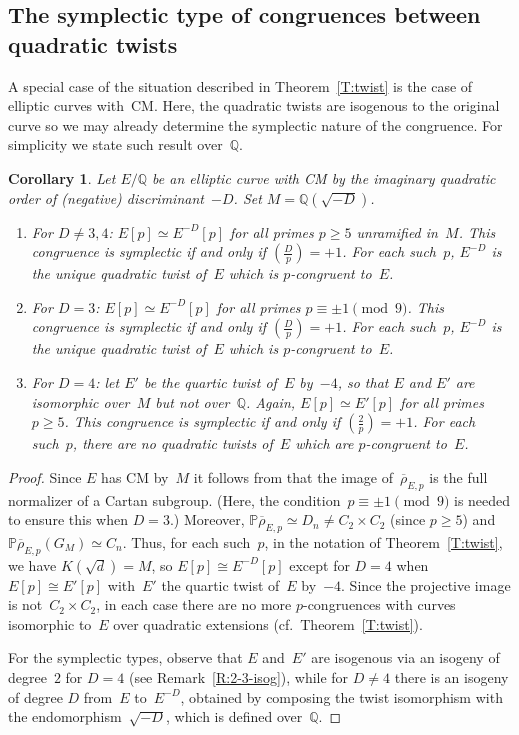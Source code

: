 \documentclass[12pt, reqno]{amsart}
\newcommand{\PP}{\mathbb{P}}
\newcommand{\Q}{\mathbb{Q}}
\newcommand{\rhobar}{{\overline{\rho}}}
\def\legendre#1#2{\left(\displaystyle\frac{#1}{#2}\right)}
\numberwithin{equation}{section}
\newtheorem{corollary}[theorem]{Corollary}
\theoremstyle{definition}
\theoremstyle{remark}
\begin{document}
\subsection{The symplectic type of congruences between quadratic twists}
\label{SS:typeQuadratic}
A special case of the situation described 
in Theorem~\ref{T:twist} is the case
of elliptic curves with~CM.  Here, the quadratic twists are isogenous
to the original curve so we may already determine the symplectic nature
of the congruence.  For simplicity we state such result over~$\Q$.

\begin{corollary}\label{C:CM-twist}
  Let $E/\Q$ be an elliptic curve with CM by the imaginary quadratic
  order of (negative) discriminant~$-D$.  Set $M=\Q(\sqrt{-D})$.

  \begin{enumerate}
  \item
    For $D\not=3,4$: $E[p] \simeq E^{-D}[p]$ for all primes $p \geq 5$
    unramified in~$M$.  This congruence
    is symplectic if and only if $\legendre{D}{p}=+1$.  For each
    such~$p$, $E^{-D}$ is the unique quadratic twist of~$E$
    which is $p$-congruent to~$E$.

  \item
    For $D=3$: $E[p] \simeq E^{-D}[p]$ for all primes $p
    \equiv\pm1\pmod{9}$.  This congruence is
    symplectic if and only if $\legendre{D}{p}=+1$.  For each
    such~$p$, $E^{-D}$ is the unique quadratic twist of~$E$ which is
    $p$-congruent to~$E$.

  \item
    For $D=4$: let $E'$ be the quartic twist of~$E$ by~$-4$, so that
    $E$ and $E'$ are isomorphic over~$M$ but not over~$\Q$.  Again,
    $E[p] \simeq E'[p]$ for all primes $p \geq 5$.  This congruence is
    symplectic if and only if $\legendre{2}{p}=+1$.  For each
    such~$p$, there are no quadratic twists of~$E$ which are
    $p$-congruent to~$E$.
  \end{enumerate}
\end{corollary}
\begin{proof}
Since $E$ has CM by~$M$ it follows from \cite[Propositions~1.14
  and~1.16]{Zywina} that the image of~$\rhobar_{E,p}$ is the full
normalizer of a Cartan subgroup.  (Here, the
condition~$p\equiv\pm1\pmod{9}$ is needed to ensure this when $D=3$.)
Moreover, $\PP \rhobar_{E,p} \simeq D_n \neq C_2 \times C_2$ (since $p
\geq 5$) and $\PP \rhobar_{E,p}(G_M) \simeq C_n$. Thus, for each
such~$p$, in the notation of Theorem~\ref{T:twist}, we have
$K(\sqrt{d})=M$, so $E[p]\cong E^{-D}[p]$ except for $D=4$ when
$E[p]\cong E'[p]$ with~$E'$ the quartic twist of~$E$ by~$-4$.  Since
the projective image is not~$C_2\times C_2$, in each case there are no
more $p$-congruences with curves isomorphic to~$E$ over quadratic
extensions (cf.~Theorem~\ref{T:twist}).

For the symplectic types, observe that $E$ and~$E'$ are isogenous via
an isogeny of degree~$2$ for $D=4$ (see Remark~\ref{R:2-3-isog}), while
for $D\not=4$ there is an isogeny of degree $D$ from~$E$ to~$E^{-D}$,
obtained by composing the twist isomorphism with the
endomorphism~$\sqrt{-D}$, which is defined over~$\Q$.
\end{proof}
\end{document}
